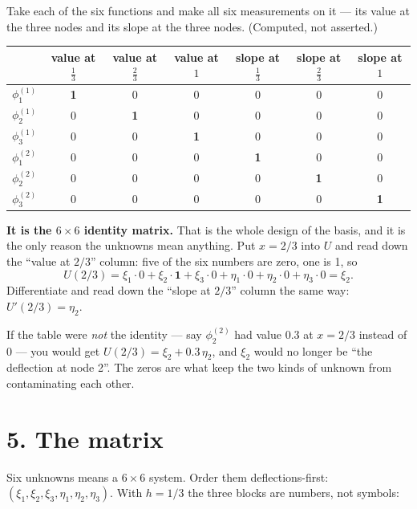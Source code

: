 \documentclass[11pt]{article}
\begin{document}
Take each of the six functions and make all six measurements on it --- its value
at the three nodes and its slope at the three nodes.  (Computed, not asserted.)

\begin{center}\small
\renewcommand{\arraystretch}{1.3}
\begin{tabular}{@{}l|ccc|ccc@{}}
\toprule
 & value at $\tfrac13$ & value at $\tfrac23$ & value at $1$
 & slope at $\tfrac13$ & slope at $\tfrac23$ & slope at $1$\\
\midrule
$\phi^{(1)}_{1}$ & \textbf{1} & 0 & 0 & 0 & 0 & 0\\
$\phi^{(1)}_{2}$ & 0 & \textbf{1} & 0 & 0 & 0 & 0\\
$\phi^{(1)}_{3}$ & 0 & 0 & \textbf{1} & 0 & 0 & 0\\
\midrule
$\phi^{(2)}_{1}$ & 0 & 0 & 0 & \textbf{1} & 0 & 0\\
$\phi^{(2)}_{2}$ & 0 & 0 & 0 & 0 & \textbf{1} & 0\\
$\phi^{(2)}_{3}$ & 0 & 0 & 0 & 0 & 0 & \textbf{1}\\
\bottomrule
\end{tabular}
\end{center}

\textbf{It is the $6\times6$ identity matrix.}  That is the whole design of the
basis, and it is the only reason the unknowns mean anything.  Put $x=2/3$ into
$U$ and read down the ``value at $2/3$'' column: five of the six numbers are
zero, one is 1, so
\[
  U(2/3)=\xi_{1}\cdot0+\xi_{2}\cdot\mathbf{1}+\xi_{3}\cdot0
        +\eta_{1}\cdot0+\eta_{2}\cdot0+\eta_{3}\cdot0=\xi_{2}.
\]
Differentiate and read down the ``slope at $2/3$'' column the same way:
$U'(2/3)=\eta_{2}$.

\medskip
If the table were \emph{not} the identity --- say $\phi^{(2)}_{2}$ had value
$0.3$ at $x=2/3$ instead of $0$ --- you would get
$U(2/3)=\xi_{2}+0.3\,\eta_{2}$, and $\xi_{2}$ would no longer be ``the
deflection at node 2''.  The zeros are what keep the two kinds of unknown from
contaminating each other.

\section*{5. The matrix}

Six unknowns means a $6\times6$ system.  Order them deflections-first:
$(\xi_{1},\xi_{2},\xi_{3},\eta_{1},\eta_{2},\eta_{3})$.  With $h=1/3$ the three
blocks are numbers, not symbols:
\end{document}
